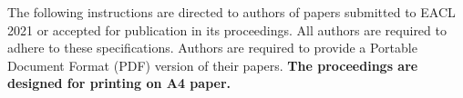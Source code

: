 
The following instructions are directed to authors of papers submitted to EACL 2021 or accepted for publication in its proceedings.
All authors are required to adhere to these specifications.
Authors are required to provide a Portable Document Format (PDF) version of their papers.
\textbf{The proceedings are designed for printing on A4 paper.}

